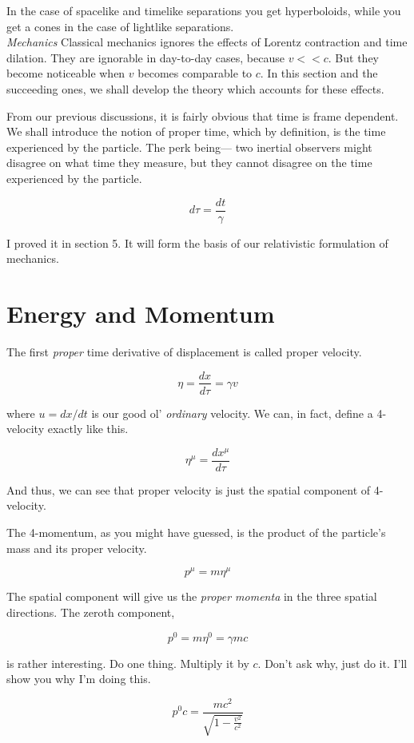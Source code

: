 \documentclass[12pt]{article}
\begin{document}
In the case of spacelike and timelike separations you get hyperboloids, while you get a cones in the case of 
lightlike separations. \\

\textit{Mechanics}
Classical mechanics ignores the effects of Lorentz contraction and time dilation. They are ignorable in day-to-day cases, 
because $v<<c$. But they become noticeable when $v$ becomes comparable to $c$. In this section and the succeeding ones, we shall
develop the theory which accounts for these effects. 

From our previous discussions, it is fairly obvious that time is frame dependent. We shall introduce the notion of proper time, which by definition, is the 
time experienced by the particle. The perk being--- two inertial observers might disagree on what time they measure, but they cannot disagree on the time experienced 
by the particle. 

\[d\tau = \frac{dt}{\gamma}\]

I proved it in section 5. It will form the basis of our relativistic formulation of mechanics. 

\section{Energy and Momentum}
The first \textit{proper} time derivative of displacement is called proper velocity. 

\[\eta = \frac{dx}{d\tau} = \gamma v\]

where $u = dx/dt$ is our good ol' \textit{ordinary} velocity. We can, in fact, define a 4-velocity exactly 
like this. 

\[\eta^{\mu} = \frac{dx^{\mu}}{d\tau}\]

And thus, we can see that proper velocity is just the spatial component 
of 4-velocity. 

The 4-momentum, as you might have guessed, is the product of the particle's mass and its proper velocity. 

\[p^{\mu} = m\eta^{\mu}\]

The spatial component will give us the \textit{proper momenta} in the three spatial directions. The zeroth component,

\[p^0 = m\eta^0 = \gamma mc\]

is rather interesting. Do one thing. Multiply it by $c$. Don't ask why, just do it. I'll show you why I'm doing this. 

\[p^0c = \frac{mc^2}{\sqrt{1-\frac{v^2}{c^2}}}\]
\end{document}
